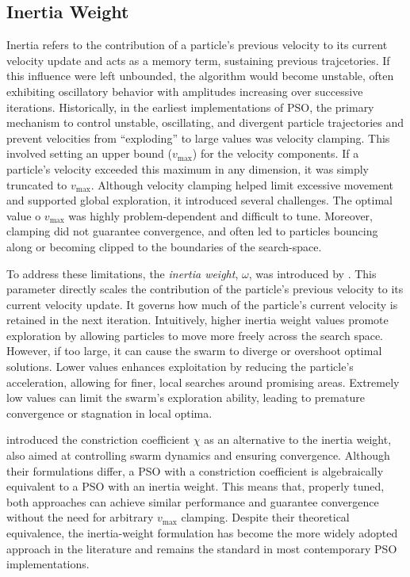{\subsection{Inertia Weight}

Inertia refers to the contribution of a particle's previous velocity to its current velocity update and acts as a memory term, sustaining previous trajcetories. If this influence were left unbounded, the algorithm would become unstable, often exhibiting oscillatory behavior with amplitudes increasing over successive iterations.
Historically, in the earliest implementations of PSO, the primary mechanism to control unstable, oscillating, and divergent particle trajectories and prevent velocities from ``exploding'' to large values was velocity clamping. This involved setting an upper bound ($v_{\text{max}}$) for the velocity components. If a particle's velocity exceeded this maximum in any dimension, it was simply truncated to $v_{\text{max}}$. Although velocity clamping helped limit excessive movement and supported global exploration, it introduced several challenges. The optimal value o $v_{\text{max}}$ was highly problem-dependent and difficult to tune. Moreover, clamping did not guarantee convergence, and often led to particles bouncing along or becoming clipped to the boundaries of the \gls{search-space}.

To address these limitations, the \textit{inertia weight}, $\omega$, was introduced by \citeauthor{shi1998modified} \parencite*{shi1998modified,shi1999empirical}. This parameter directly scales the contribution of the particle's previous velocity to its current velocity update. It governs how much of the particle's current velocity is retained in the next iteration. Intuitively, higher inertia weight values promote exploration by allowing particles to move more freely across the search space. However, if too large, it can cause the swarm to diverge or overshoot optimal solutions.
Lower values  enhances exploitation by reducing the particle's acceleration, allowing for finer, local searches around promising areas.  Extremely low values can limit the swarm's exploration ability, leading to premature convergence or stagnation in local optima.

\citet{clerc2002particle} introduced the constriction coefficient $\chi$ as an alternative to the inertia weight, also aimed at controlling swarm dynamics and ensuring convergence. Although their formulations differ, a PSO with a constriction coefficient is algebraically equivalent to a PSO with an inertia weight. This means that, properly tuned, both approaches can achieve similar performance and guarantee convergence without the need for arbitrary $v_{\text{max}}$ clamping. Despite their theoretical equivalence, the inertia-weight formulation has become the more widely adopted approach in the literature and remains the standard in most contemporary PSO implementations.

}
